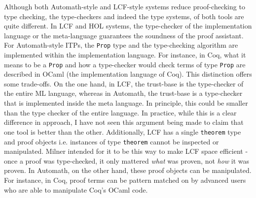\documentclass{article}
\begin{document}
  	Although both Automath-style and 
  	LCF-style systems reduce proof-checking
  	to type checking, the type-checkers 
  	and indeed the type systems, 
  	of both tools are quite different.
  	In LCF and HOL systems, the 
  	type-checker of the implementation 
  	language or the meta-language 
  	guarantees the soundness of the
  	proof assistant. For Automath-style
  	ITPs, the \texttt{Prop} type and the 
  	type-checking algorithm are 
  	implemented within the 
  	implementation language. For 
  	instance, in Coq, what it means to 
  	be a \texttt{Prop} and how a 
  	type-checker would check 
  	terms of type \texttt{Prop} are 
  	described in OCaml (the 
  	implementation language of Coq). 
  	This distinction
  	offers some trade-offs. On the one 
  	hand, in LCF, the trust-base is 
  	the type-checker of the entire
  	ML language, whereas in Automath, 
  	the trust-base is a type-checker
  	that is implemented inside the 
  	meta language. In principle, this 
  	could be smaller than the type
  	checker of the entire language.
  	In practice, while this is a 
  	clear difference in approach,
  	I have not seen this argument 
  	being made to claim that one tool 
  	is better than the other. 
  	Additionally, LCF has a single 
  	\texttt{theorem} type and proof
  	objects i.e. instances of type
  	\texttt{theorem} cannot be 
  	inspected or manipulated. Milner
  	intended for it to be this way
  	to make LCF space efficient - 
  	once a proof was type-checked, 
  	it only mattered \textit{what}
  	was proven, not \textit{how} it 
  	was proven. In Automath, on the 
  	other hand, these proof objects 
  	can be manipulated.
  	For instance, in Coq, proof terms 
  	can be pattern matched on by 
  	advanced users who are able to 
  	manipulate Coq's OCaml code.
  	
\end{document}
